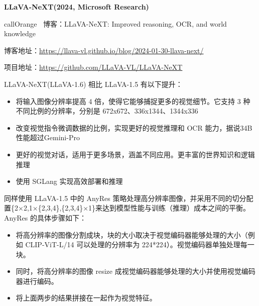 \documentclass[zihao=false,fontset=windows]{ctexart}
\begin{document}
{\bfseries LLaVA-NeXT(2024, Microsoft Research)\par}
\begin{feishubox}{callOrange}{🙋‍♀}
博客：LLaVA-NeXT: Improved reasoning, OCR, and world knowledge\par
博客地址：\href{https://llava-vl.github.io/blog/2024-01-30-llava-next/}{https://llava-vl.github.io/blog/2024-01-30-llava-next/}\par
项目地址：\href{https://github.com/LLaVA-VL/LLaVA-NeXT}{https://github.com/LLaVA-VL/LLaVA-NeXT}\par
\end{feishubox}
LLaVA-NeXT(LLaVA-1.6) 相比 LLaVA-1.5 有以下提升：\par
\begin{itemize}
\item 将输入图像分辨率提高 4 倍，使得它能够捕捉更多的视觉细节。它支持 3 种不同比例的分辨率，分别是 672x672、336x1344、1344x336
\item 改变视觉指令微调数据的比例，实现更好的视觉推理和 OCR 能力，据说34B性能超过Gemini-Pro
\item 更好的视觉对话，适用于更多场景，涵盖不同应用。更丰富的世界知识和逻辑推理
\item 使用 SGLang 实现高效部署和推理
\end{itemize}
\par\vspace{1.15em}\par\vspace{0.28em}
\par\vspace{0.95em}\par\vspace{0.28em}
同样使用 LLaVA-1.5 中的 AnyRes 策略处理高分辨率图像，并采用不同的切分配置\{2×2,1×\{2,3,4\},\{2,3,4\}×1\}来达到模型性能与训练（推理）成本之间的平衡。AnyRes 的具体步骤如下：\par
\begin{itemize}
\item 将高分辨率的图像分割成块，块的大小取决于视觉编码器能够处理的大小（例如 CLIP-ViT-L/14 可以处理的分辨率为 224*224）。视觉编码器单独处理每一块。
\item 同时，将高分辨率的图像 resize 成视觉编码器能够处理的大小并使用视觉编码器进行编码。
\item 将上面两步的结果拼接在一起作为视觉特征。
\end{itemize}
\end{document}
